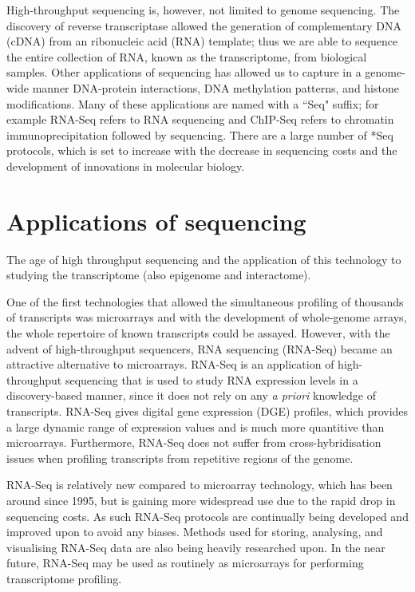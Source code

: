 High-throughput sequencing is, however, not limited to genome sequencing. The discovery of reverse transcriptase\cite{pmid4316300, pmid4316301} allowed the generation of complementary DNA (cDNA) from an ribonucleic acid (RNA) template; thus we are able to sequence the entire collection of RNA, known as the transcriptome, from biological samples. Other applications of sequencing has allowed us to capture in a genome-wide manner DNA-protein interactions, DNA methylation patterns, and histone modifications\cite{applicationsofsequencing}. Many of these applications are named with a ``Seq" suffix; for example RNA-Seq refers to RNA sequencing and ChIP-Seq refers to chromatin immunoprecipitation followed by sequencing. There are a large number of *Seq protocols\cite{pachter2014seq}, which is set to increase with the decrease in sequencing costs and the development of innovations in molecular biology.

\section{Applications of sequencing}

The age of high throughput sequencing and the application of this technology to studying the transcriptome (also epigenome and interactome).

One of the first technologies that allowed the simultaneous profiling of thousands of transcripts was microarrays and with the development of whole-genome arrays, the whole repertoire of known transcripts could be assayed. However, with the advent of high-throughput sequencers, RNA sequencing (RNA-Seq) became an attractive alternative to microarrays. RNA-Seq is an application of high-throughput sequencing that is used to study RNA expression levels in a discovery-based manner, since it does not rely on any \textit{a priori} knowledge of transcripts. RNA-Seq gives digital gene expression (DGE) profiles, which provides a large dynamic range of expression values and is much more quantitive than microarrays. Furthermore, RNA-Seq does not suffer from cross-hybridisation issues when profiling transcripts from repetitive regions of the genome.

RNA-Seq is relatively new compared to microarray technology, which has been around since 1995, but is gaining more widespread use due to the rapid drop in sequencing costs. As such RNA-Seq protocols are continually being developed and improved upon to avoid any biases. Methods used for storing, analysing, and visualising RNA-Seq data are also being heavily researched upon. In the near future, RNA-Seq may be used as routinely as microarrays for performing transcriptome profiling.

